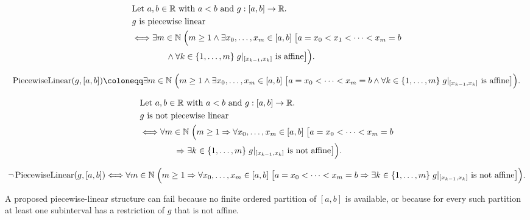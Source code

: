 \begin{remark*}
\[
\begin{aligned}
&\text{Let } a,b \in \mathbb{R} \text{ with } a<b \text{ and } g:[a,b]\to\mathbb{R}.\\
&g \text{ is piecewise linear}\\
&\Longleftrightarrow
\exists m \in \mathbb{N}\;\Bigl(m \ge 1 \land
\exists x_0,\ldots,x_m \in [a,b]\;
\bigl[a=x_0 < x_1 < \cdots < x_m = b\\
&\qquad\qquad\land
\forall k \in \{1,\ldots,m\}\; g|_{[x_{k-1},x_k]} \text{ is affine}\bigr]\Bigr).
\end{aligned}
\]
\end{remark*}

\begin{remark*}
\[
\operatorname{PiecewiseLinear}(g,[a,b]) \coloneqq
\exists m \in \mathbb{N}\;\Bigl(m \ge 1 \land
\exists x_0,\ldots,x_m \in [a,b]\;
\bigl[a=x_0 < \cdots < x_m = b \land
\forall k \in \{1,\ldots,m\}\; g|_{[x_{k-1},x_k]} \text{ is affine}\bigr]\Bigr).
\]
\end{remark*}

\begin{remark*}
\[
\begin{aligned}
&\text{Let } a,b \in \mathbb{R} \text{ with } a<b \text{ and } g:[a,b]\to\mathbb{R}.\\
&g \text{ is not piecewise linear}\\
&\Longleftrightarrow
\forall m \in \mathbb{N}\;\Bigl(m \ge 1 \Rightarrow
\forall x_0,\ldots,x_m \in [a,b]\;
\bigl[a=x_0 < \cdots < x_m = b\\
&\qquad\qquad\Rightarrow
\exists k \in \{1,\ldots,m\}\; g|_{[x_{k-1},x_k]} \text{ is not affine}\bigr]\Bigr).
\end{aligned}
\]
\end{remark*}

\begin{remark*}
\[
\neg\operatorname{PiecewiseLinear}(g,[a,b])
\Longleftrightarrow
\forall m \in \mathbb{N}\;\Bigl(m \ge 1 \Rightarrow
\forall x_0,\ldots,x_m \in [a,b]\;
\bigl[a=x_0 < \cdots < x_m = b
\Rightarrow
\exists k \in \{1,\ldots,m\}\; g|_{[x_{k-1},x_k]} \text{ is not affine}\bigr]\Bigr).
\]
\end{remark*}

\begin{remark*}
A proposed piecewise-linear structure can fail because no finite ordered
partition of $[a,b]$ is available, or because for every such partition
at least one subinterval has a restriction of $g$ that is not affine.
\end{remark*}

